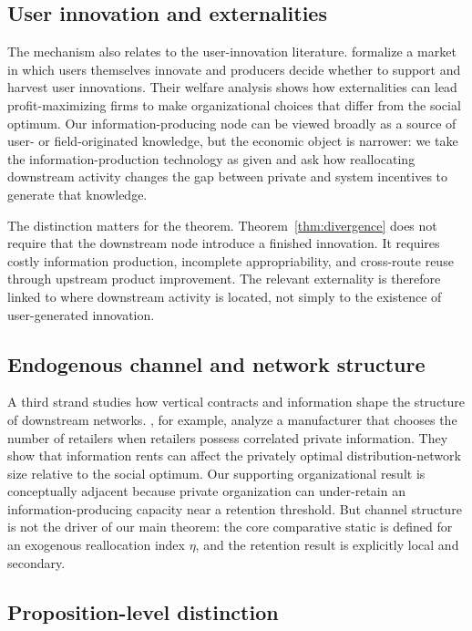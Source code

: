 \subsection{User innovation and externalities}

The mechanism also relates to the user-innovation literature. \citet{GambardellaRaaschVonHippel2017} formalize a market in which users themselves innovate and producers decide whether to support and harvest user innovations. Their welfare analysis shows how externalities can lead profit-maximizing firms to make organizational choices that differ from the social optimum. Our information-producing node can be viewed broadly as a source of user- or field-originated knowledge, but the economic object is narrower: we take the information-production technology as given and ask how reallocating downstream activity changes the gap between private and system incentives to generate that knowledge.

The distinction matters for the theorem. Theorem~\ref{thm:divergence} does not require that the downstream node introduce a finished innovation. It requires costly information production, incomplete appropriability, and cross-route reuse through upstream product improvement. The relevant externality is therefore linked to where downstream activity is located, not simply to the existence of user-generated innovation.

\subsection{Endogenous channel and network structure}

A third strand studies how vertical contracts and information shape the structure of downstream networks. \citet{PagnozziPiccoloReisinger2021}, for example, analyze a manufacturer that chooses the number of retailers when retailers possess correlated private information. They show that information rents can affect the privately optimal distribution-network size relative to the social optimum. Our supporting organizational result is conceptually adjacent because private organization can under-retain an information-producing capacity near a retention threshold. But channel structure is not the driver of our main theorem: the core comparative static is defined for an exogenous reallocation index $\eta$, and the retention result is explicitly local and secondary.

\subsection{Proposition-level distinction}

